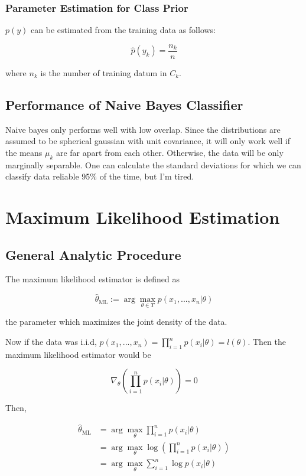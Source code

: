 \documentclass[11pt]{scrartcl}
\begin{document}
\subsubsection{Parameter Estimation for Class Prior}

$p(y)$ can be estimated from the training data as follows:

\[\hat{p}(y_k) = \frac{n_k}{n}\]

where $n_k$ is the number of training datum in $C_k$.

\subsection{Performance of Naive Bayes Classifier}

Naive bayes only performs well with low overlap. Since the distributions are assumed to be spherical gaussian with unit covariance, it will only work well if the means $\mu_k$ are far apart from each other. Otherwise, the data will be only marginally separable. One can calculate the standard deviations for which we can classify data reliable 95\% of the time, but I'm tired.

\section{Maximum Likelihood Estimation}

\subsection{General Analytic Procedure}

The maximum likelihood estimator is defined as

\[\hat{\theta}_{\mathrm{ML}} := \arg\max_{\theta \in T} p(x_1, ... , x_n | \theta)\]

the parameter which maximizes the joint density of the data.

Now if the data was i.i.d, $p(x_1, ... ,x_n) = \prod_{i=1}^n p(x_i|\theta) = l(\theta)$. Then the maximum likelihood estimator would be 

\[\nabla_\theta \left( \prod_{i=1}^n p(x_i|\theta) \right) = 0\]

Then,

\begin{align*}
\hat{\theta}_{\mathrm{ML}} &= \arg\max_\theta \prod_{i=1}^n p(x_i|\theta) \\
&= \arg\max_\theta \log{\left( \prod_{i=1}^n p(x_i |\theta) \right)} \\
&= \arg\max_\theta \sum_{i=1}^n \log{p(x_i|\theta)}
\end{align*}
\end{document}
